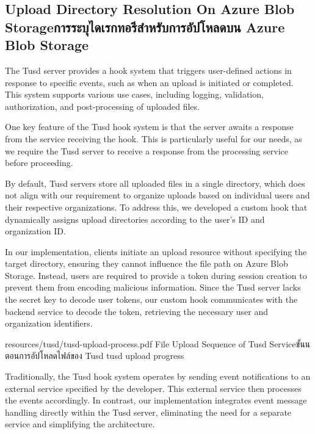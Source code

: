 \subsection{\ifenglish Upload Directory Resolution On Azure Blob Storage\else การระบุไดเรกทอรีสำหรับการอัปโหลดบน Azure Blob Storage\fi}

The Tusd server provides a hook system that triggers user-defined actions in response to specific events, such as when an upload is initiated or completed. This system supports various use cases, including logging, validation, authorization, and post-processing of uploaded files.

One key feature of the Tusd hook system is that the server awaits a response from the service receiving the hook. This is particularly useful for our needs, as we require the Tusd server to receive a response from the processing service before proceeding.

By default, Tusd servers store all uploaded files in a single directory, which does not align with our requirement to organize uploads based on individual users and their respective organizations. To address this, we developed a custom hook that dynamically assigns upload directories according to the user's ID and organization ID.

In our implementation, clients initiate an upload resource without specifying the target directory, ensuring they cannot influence the file path on Azure Blob Storage. Instead, users are required to provide a token during session creation to prevent them from encoding malicious information. Since the Tusd server lacks the secret key to decode user tokens, our custom hook communicates with the backend service to decode the token, retrieving the necessary user and organization identifiers.

\insertPDFfigure
{resources/tusd/tusd-upload-process.pdf}
{\ifenglish File Upload Sequence of Tusd Service\else ขั้นนตอนการอัปโหลดไฟล์ของ Tusd\fi}
{tusd upload progress}

Traditionally, the Tusd hook system operates by sending event notifications to an external service specified by the developer. This external service then processes the events accordingly. In contrast, our implementation integrates event message handling directly within the Tusd server, eliminating the need for a separate service and simplifying the architecture.